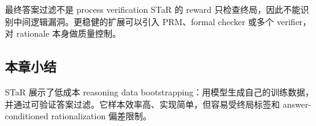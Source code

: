 \begin{warningbox}{最终答案过滤不是 process verification}
STaR 的 reward 只检查终局，因此不能识别中间逻辑漏洞。更稳健的扩展可以引入 PRM、formal checker 或多个 verifier，对 rationale 本身做质量控制。
\end{warningbox}

\subsection{本章小结}

STaR 展示了低成本 reasoning data bootstrapping：用模型生成自己的训练数据，并通过可验证答案过滤。它样本效率高、实现简单，但容易受终局标签和 answer-conditioned rationalization 偏差限制。

